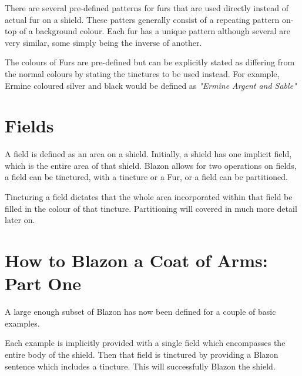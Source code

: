 There are several pre-defined patterns for furs that are used directly instead of actual fur on a shield.  These patters generally consist of a repeating pattern on-top of a background colour.  Each fur has a unique pattern although several are very similar, some simply being the inverse of another.

The colours of Furs are pre-defined but can be explicitly stated as differing from the normal colours  by stating the tinctures to be used instead.  For example, Ermine coloured silver and black would be defined as \emph{"Ermine Argent and Sable"} 


\section{Fields}
A field is defined as an area on a shield.  Initially, a shield has one implicit field, which is the entire area of that shield.  Blazon allows for two operations on fields, a field can be tinctured, with a tincture or a Fur, or a field can be partitioned. 

Tincturing a field dictates that the whole area incorporated within that field be filled in the colour of that tincture.  Partitioning will covered in much more detail later on.



\section{How to Blazon a Coat of Arms: Part One}

A large enough subset of Blazon has now been defined for a couple of basic examples.  

Each example is implicitly provided with a single field which encompasses the entire body of the shield.  Then that field is tinctured by providing a Blazon sentence which includes a tincture.  This will successfully Blazon the shield.

